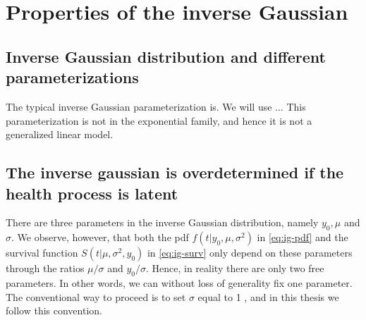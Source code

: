 \section{Properties of the inverse Gaussian}

\subsection{Inverse Gaussian distribution and different parameterizations}
The typical inverse Gaussian parameterization is.
We will use ...
This parameterization is not in the exponential family, and hence it is not a generalized linear model.

\subsection{The inverse gaussian is overdetermined if the health process is latent}
\label{subsec:overdetermined}
There are three parameters in the inverse Gaussian distribution, namely $y_0, \mu$ and $\sigma$.
We observe, however, that both the pdf $f(t|y_0,\mu,\sigma^2)$ in \eqref{eq:ig-pdf} and the survival function $S(t|\mu,\sigma^2,y_0)$ in \eqref{eq:ig-surv} only depend on these parameters through the ratios $\mu/\sigma$ and $y_0/\sigma$.
Hence, in reality there are only two free parameters.
In other words, we can without loss of generality fix one parameter.
The conventional way to proceed is to set $\sigma$ equal to 1 \citep{leewhitmore2006}, and in this thesis we follow this convention.

